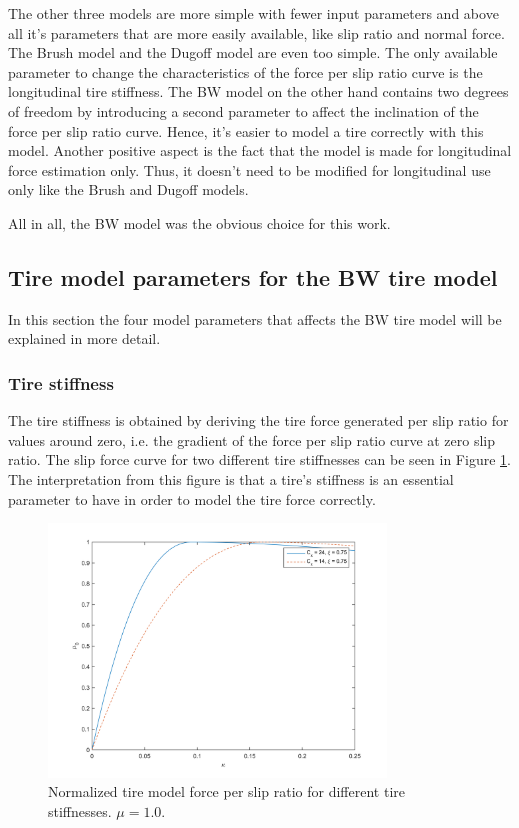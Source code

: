 The other three models are more simple with fewer input parameters and above all it's parameters that are more easily available, like slip ratio and normal force. The Brush model and the Dugoff model are even too simple. The only available parameter to change the characteristics of the force per slip ratio curve is the longitudinal tire stiffness. The BW model on the other hand contains two degrees of freedom by introducing a second parameter to affect the inclination of the force per slip ratio curve. Hence, it's easier to model a tire correctly with this model. Another positive aspect is the fact that the model is made for longitudinal force estimation only. Thus, it doesn't need to be modified for longitudinal use only like the Brush and Dugoff models.

All in all, the BW model was the obvious choice for this work.

\subsection{Tire model parameters for the BW tire model}
In this section the four model parameters that affects the BW tire model will be explained in more detail.

\subsubsection{Tire stiffness}
The tire stiffness is obtained by deriving the tire force generated per slip ratio for values around zero, i.e. the gradient of the force per slip ratio curve at zero slip ratio. The slip force curve for two different tire stiffnesses can be seen in Figure \ref{different_cx}. The interpretation from this figure is that a tire's stiffness is an essential parameter to have in order to model the tire force correctly. 

\begin{figure}[h]
	\centering
	\includegraphics[width=0.8\textwidth]{Pictures/slipkraft_olika_cx}
	\caption {Normalized tire model force per slip ratio for different tire stiffnesses. $ \mu = 1.0 $.}
	\label{different_cx}
\end{figure}


